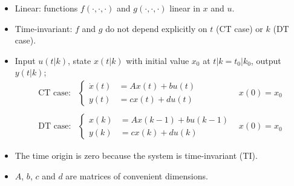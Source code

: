 \begin{frame}
\myPause
 \begin{itemize}[<+-| alert@+>]
 \item \vspace{2mm}Linear: functions $f(\cdot,\cdot,\cdot)$ and  $g(\cdot,\cdot,\cdot)$ linear in $x$ and $u$.
 \item Time-invariant: $f$ and $g$ do not depend explicitly on $t$ (CT case) or $k$ (DT case).
 \item Input $u(t|k)$, state $x(t|k)$ with initial value $x_0$ at $t|k=t_0|k_0$, output $y(t|k)$;
       \begin{displaymath}
         \begin{array}{lll}
          \text{CT case:} & 
          \left\{\begin{array}{rll}
           \dot{x}(t) &= Ax(t)+bu(t) \\
           y(t)       &= cx(t)+du(t)
          \end{array}\right. &
          x(0) = x_0 \\ \\
          \text{DT case:} & 
          \left\{\begin{array}{rll}
           x(k) &= Ax(k-1)+bu(k-1) \\
           y(k) &= cx(k)+du(k)
          \end{array}\right. &
          x(0) = x_0
         \end{array}
        \end{displaymath}
 \item \vfill The time origin is zero because the system is time-invariant (TI).
 \item $A$, $b$, $c$ and $d$ are matrices of convenient dimensions. 
 \end{itemize}
\end{frame}

